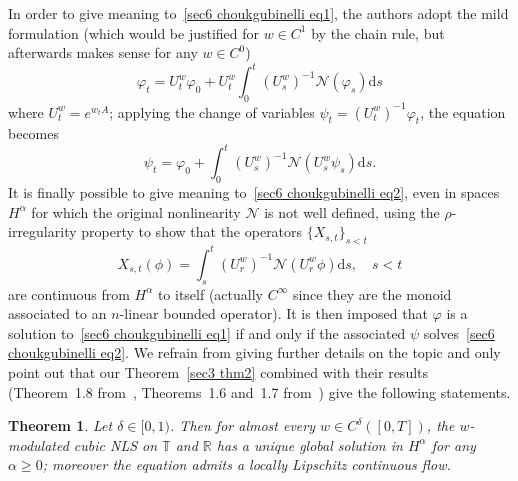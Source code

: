 \documentclass[10pt]{article}
\newcommand{\mathd}{\mathrm{d}}
\newtheorem{theorem}{Theorem}
\begin{document}
In order to give meaning to~{\eqref{sec6 choukgubinelli eq1}}, the authors
adopt the mild formulation (which would be justified for $w \in C^1$ by the
chain rule, but afterwards makes sense for any $w \in C^0$)
\[ \varphi_t = U^w_t \varphi_0 + U^w_t \int_0^t (U^w_s)^{- 1} \mathcal{N}
   (\varphi_s) \mathd s \]
where $U^w_t = e^{w_t A}$; applying the change of variables $\psi_t =
(U^w_t)^{- 1} \varphi_t$, the equation becomes
\begin{equation}
  \psi_t = \varphi_0 + \int_0^t (U^w_s)^{- 1} \mathcal{N} (U^w_s \psi_s)
  \mathd s \label{sec6 choukgubinelli eq2} .
\end{equation}
It is finally possible to give meaning to~{\eqref{sec6 choukgubinelli eq2}},
even in spaces $H^{\alpha}$ for which the original nonlinearity $\mathcal{N}$
is not well defined, using the $\rho$\mbox{-}irregularity property to show
that the operators $\{ X_{s, t} \}_{s < t}$
\[ X_{s, t} (\phi) = \int_s^t (U^w_r)^{- 1} \mathcal{N} (U^w_r \phi) \mathd s,
   \quad s < t \]
are continuous from $H^{\alpha}$ to itself (actually $C^{\infty}$ since they
are the monoid associated to an $n$\mbox{-}linear bounded operator). It is
then imposed that $\varphi$ is a solution to~{\eqref{sec6 choukgubinelli eq1}}
if and only if the associated $\psi$ solves~{\eqref{sec6 choukgubinelli eq2}}.
We refrain from giving further details on the topic and only point out that
our Theorem~\ref{sec3 thm2} combined with their results (Theorem~1.8
from~{\cite{choukgubinelli1}}, Theorems~1.6 and~1.7
from~{\cite{choukgubinelli2}}) give the following statements.

\begin{theorem}
  \label{sec6 thm nls}Let $\delta \in [0, 1)$. Then for almost every $w \in
  C^{\delta} ([0, T])$, the $w$\mbox{-}modulated cubic NLS on $\mathbb{T}$ and
  $\mathbb{R}$ has a unique global solution in $H^{\alpha}$ for any $\alpha
  \geqslant 0$; moreover the equation admits a locally Lipschitz continuous
  flow.
\end{theorem}
\end{document}
